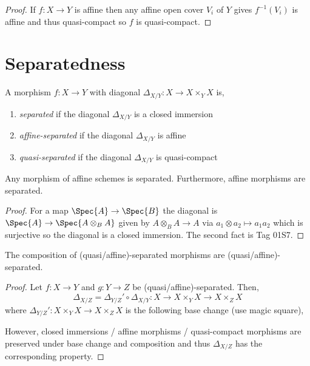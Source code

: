 \documentclass[12pt]{article}
\begin{document}
\begin{proof}
If $f : X \to Y$ is affine then any affine open cover $V_i$ of $Y$ gives $f^{-1}(V_i)$ is affine and thus quasi-compact so $f$ is quasi-compact. 
\end{proof}



\section{Separatedness}

\begin{defn}
A morphism $f : X \to Y$ with diagonal $\Delta_{X/Y} : X \to X \times_Y X$ is,
\begin{enumerate}
\item \textit{separated} if the diagonal $\Delta_{X/Y}$ is a closed immersion
\item \textit{affine-separated} if the diagonal $\Delta_{X/Y}$ is affine
\item \textit{quasi-separated} if the diagonal $\Delta_{X/Y}$ is quasi-compact
\end{enumerate}
\end{defn}

\begin{lemma}
Any morphism of affine schemes is separated. Furthermore, affine morphisms are separated.
\end{lemma}

\begin{proof}
For a map $\Spec{A} \to \Spec{B}$ the diagonal is $\Spec{A} \to \Spec{A \otimes_B A}$ given by $A \otimes_B A \to A$ via $a_1 \otimes a_2 \mapsto a_1 a_2$ which is surjective so the diagonal is a closed immersion. The second fact is Tag 01S7.
\end{proof}

\begin{lemma}
The composition of (quasi/affine)-separated morphisms are (quasi/affine)-separated. 
\end{lemma}

\begin{proof}
Let $f : X \to Y$ and $g : Y \to Z$ be (quasi/affine)-separated. Then,
\[ \Delta_{X/Z} = \Delta_{Y/Z}' \circ \Delta_{X/Y} : X \to X \times_Y X \to X \times_Z X \]
where $\Delta_{Y/Z}' : X \times_Y X \to X \times_Z X$ is the following base change (use magic square),
\begin{center}
\end{center}
However, closed immersions / affine morphisms / quasi-compact morphisms are preserved under base change and composition and thus $\Delta_{X/Z}$ has the corresponding property.
\end{proof}
\end{document}
